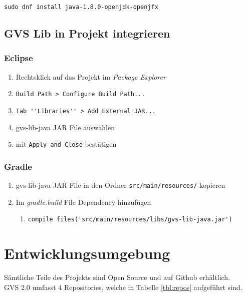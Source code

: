 \documentclass[11pt,a4paper,english,oneside]{book}
\numberwithin{equation}{chapter}
\begin{document}
	\lstinline{sudo dnf install java-1.8.0-openjdk-openjfx}
		
	\section{GVS Lib in Projekt integrieren}
	\subsection{Eclipse}
	\begin{enumerate}
		\item Rechtsklick auf das Projekt im \textit{Package Explorer}
		\item \lstinline{Build Path > Configure Build Path...}
		\item \lstinline{Tab ''Libraries'' > Add External JAR...}
		\item gvs-lib-java JAR File auswählen
		\item mit \lstinline{Apply and Close} bestätigen
	\end{enumerate}

	\subsection{Gradle}
	\begin{enumerate}
		\item gvs-lib-java JAR File in den Ordner \lstinline{src/main/resources/} kopieren
		\item Im \textit{gradle.build} File Dependency hinzufügen
		\begin{enumerate}
			\item \lstinline{compile files('src/main/resources/libs/gvs-lib-java.jar')}
		\end{enumerate}
	\end{enumerate}
	
	\chapter{Entwicklungsumgebung}
	Sämtliche Teile des Projekts sind Open Source und auf Github erhältlich.
	\\
	GVS 2.0 umfasst 4 Repositories, welche in Tabelle \ref{tbl:repos} aufgeführt sind.
	
\end{document}
